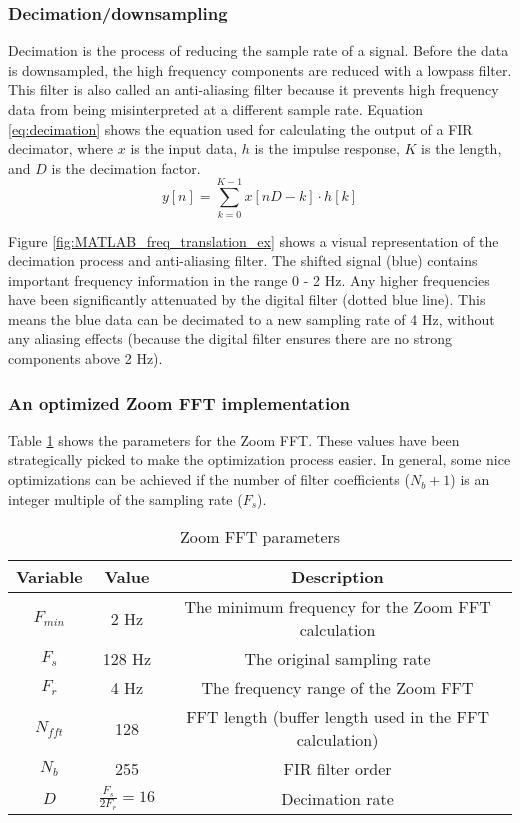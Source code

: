 \subsubsection{Decimation/downsampling}
Decimation is the process of reducing the sample rate of a signal.  Before the data is downsampled, the high frequency components are reduced with a lowpass filter. This filter is also called an anti-aliasing filter because it prevents high frequency data from being misinterpreted at a different sample rate.  Equation \ref{eq:decimation} shows the equation used for calculating the output of a FIR decimator, where $x$ is the input data, $h$ is the impulse response, $K$ is the length, and $D$ is the decimation factor\cite{decimation_ref}.
\begin{equation} \label{eq:decimation}
	y[n] = \sum_{k=0}^{K-1} x[nD-k] \cdot h[k]
\end{equation}

Figure \ref{fig:MATLAB_freq_translation_ex} shows a visual representation of the decimation process and anti-aliasing filter.  The shifted signal (blue) contains important frequency information in the range 0 - 2 Hz.  Any higher frequencies have been significantly attenuated by the digital filter (dotted blue line).  This means the blue data can be decimated to a new sampling rate of 4 Hz, without any aliasing effects (because the digital filter ensures there are no strong components above 2 Hz).



\subsubsection{An optimized Zoom FFT implementation}

Table \ref{t:zoom_fft_parameters} shows the parameters for the Zoom FFT.  These values have been strategically picked to make the optimization process easier.  In general, some nice optimizations can be achieved if the number of filter coefficients ($N_b+1$) is an integer multiple of the sampling rate ($F_s$).

\begin{table}[]
\centering
\caption{Zoom FFT parameters}
\label{t:zoom_fft_parameters}
\vspace*{0.2in}
\begin{tabular}{|c|c|c|}
\rowcolor[HTML]{EFEFEF} 
\hline
\textbf{Variable} & \textbf{Value} & \textbf{Description} \\ \hline
$F_{min}$ & 2 Hz & The minimum frequency for the Zoom FFT calculation\\ \hline
$F_s$ & 128 Hz & The original sampling rate\\ \hline
$F_r$ & 4 Hz & The frequency range of the Zoom FFT\\ \hline
$N_{fft}$ & 128 & FFT length (buffer length used in the FFT calculation)\\ \hline
$N_b$ & 255 & FIR filter order \\ \hline
$D$ & $\frac{F_s}{2 F_r}=16$ & Decimation rate \\ \hline
\end{tabular}
\end{table}

